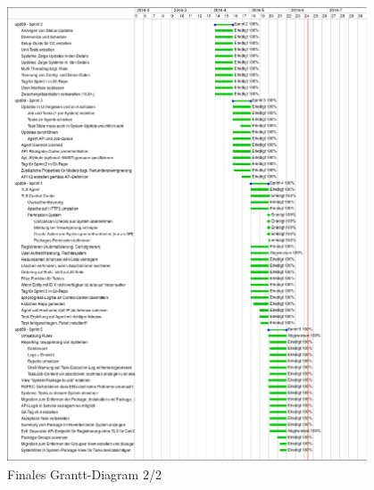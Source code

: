\begin{figure}
  \centering
    \includegraphics[width=0.95\textwidth]{fig/upd89-gantt-part2}
  \caption{Finales  Grantt-Diagram 2/2}
  \label{fig:gantt-final2}
\end{figure}
